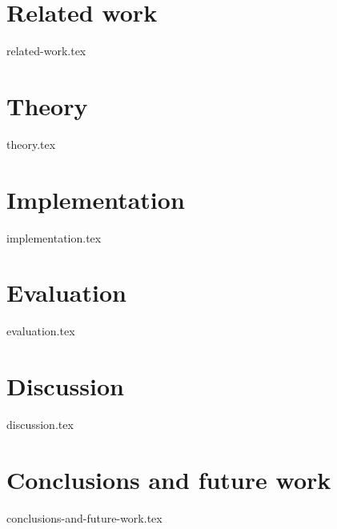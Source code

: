 \documentclass[12pt, a4paper]{book}
\begin{document}
\chapter{Related work}
\label{sec:relatedwork}
{related-work.tex}

\chapter{Theory}
\label{sec:theory}
{theory.tex}

\chapter{Implementation}
\label{sec:implementation}
{implementation.tex}

\chapter{Evaluation}
\label{sec:evaluation}
{evaluation.tex}

\chapter{Discussion}
\label{sec:discussion}
{discussion.tex}

\chapter{Conclusions and future work}
\label{sec:conclusions}
{conclusions-and-future-work.tex}


\clearpage
\printglossary[type=\acronymtype]
\label{sec:acronym}

\clearpage
\printbibliography
\end{document}
